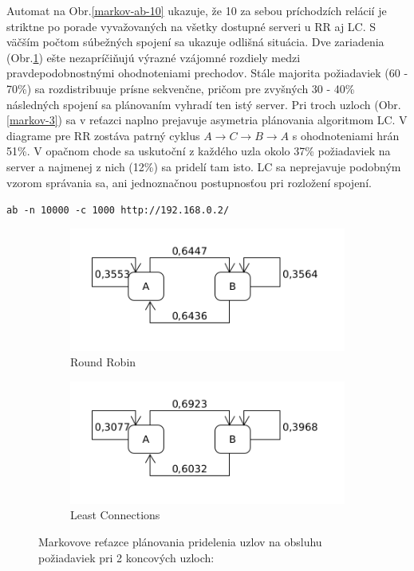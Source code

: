 \documentclass[12pt, a4paper]{article}
\begin{document}
Automat na Obr.\ref{markov-ab-10} ukazuje, že 10 za sebou príchodzích relácií je striktne po porade 
vyvažovaných na všetky dostupné serveri u RR aj LC. S väčším počtom súbežných spojení sa ukazuje odlišná 
situácia. Dve zariadenia (Obr.\ref{markov-2}) ešte nezapríčiňujú výrazné vzájomné rozdiely medzi 
pravdepodobnostnými ohodnoteniami
prechodov. Stále majorita požiadaviek (60 - 70\%) sa rozdistribuuje prísne sekvenčne, pričom
pre zvyšných 30 - 40\% následných spojení sa plánovaním vyhradí ten istý server. Pri troch uzloch 
(Obr.\ref{markov-3})
sa v reťazci naplno prejavuje asymetria plánovania algoritmom LC. V diagrame pre RR zostáva patrný
cyklus $A \rightarrow C \rightarrow B \rightarrow  A$ s ohodnoteniami hrán 51\%. V opačnom chode sa 
uskutoční z každého uzla okolo 37\% požiadaviek na server a najmenej z nich (12\%) sa pridelí tam isto. 
LC sa neprejavuje podobným vzorom správania sa, ani jednoznačnou postupnosťou pri rozložení spojení.

\begin{lrbox}{\shield}
\verb|ab -n 10000 -c 1000 http://192.168.0.2/|
\end{lrbox}
\begin{figure}[h!]
	\centering
	\begin{subfigure}[t]{.48\textwidth}
  		\centering
  		\includegraphics[width=\textwidth]{images/10000-2-RR.png}
  		\caption{Round Robin}
	\end{subfigure}
	\begin{subfigure}[t]{.48\textwidth}
  		\centering
  		\includegraphics[width=\textwidth]{images/10000-2-LC.png}
  		\caption{Least Connections}
	\end{subfigure}
	\caption{Markovove reťazce plánovania pridelenia uzlov na obsluhu požiadaviek
	pri 2 koncových uzloch: \usebox{\shield}
	}
	\label{markov-2}
\end{figure}
\end{document}
